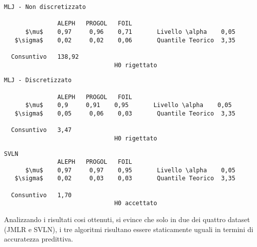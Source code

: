 \begin{verbatim}
MLJ - Non discretizzato

               ALEPH   PROGOL   FOIL
      $\mu$    0,97     0,96    0,71       Livello \alpha    0,05
   $\sigma$    0,02     0,02    0,06       Quantile Teorico  3,35
     
  Consuntivo   138,92
                               H0 rigettato
\end{verbatim}

\begin{verbatim}
MLJ - Discretizzato

               ALEPH   PROGOL   FOIL
      $\mu$    0,9     0,91    0,95       Livello \alpha    0,05
   $\sigma$    0,05     0,06    0,03       Quantile Teorico  3,35
     
  Consuntivo   3,47
                               H0 rigettato
\end{verbatim}

\begin{verbatim}
SVLN
               ALEPH   PROGOL   FOIL
      $\mu$    0,97     0,97    0,95       Livello \alpha    0,05
   $\sigma$    0,02     0,03    0,03       Quantile Teorico  3,35
     
  Consuntivo   1,70
                               H0 accettato
\end{verbatim}

Analizzando i risultati cosi ottenuti, si evince che solo in due dei quattro dataset (JMLR e SVLN), i tre algoritmi risultano essere staticamente uguali in termini di accuratezza predittiva.